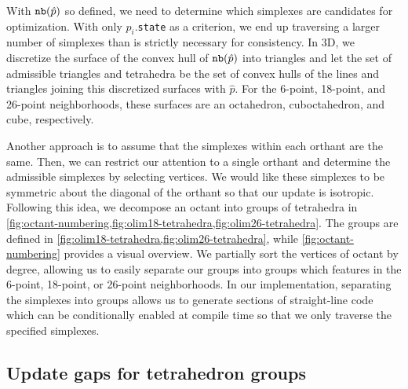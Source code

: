 \documentclass[eikonal.tex]{subfiles}
\begin{document}
With $\texttt{nb}(\hat{p})$ so defined, we need to determine which simplexes
are candidates for optimization. With only $p_i$.\texttt{state} as a
criterion, we end up traversing a larger number of simplexes than is
strictly necessary for consistency. In 3D, we discretize the surface
of the convex hull of $\texttt{nb}(\hat{p})$ into triangles and let the set
of admissible triangles and tetrahedra be the set of convex hulls of
the lines and triangles joining this discretized surfaces with
$\hat{p}$. For the 6-point, 18-point, and 26-point neighborhoods,
these surfaces are an octahedron, cuboctahedron, and cube,
respectively.

Another approach is to assume that the simplexes within each orthant
are the same. Then, we can restrict our attention to a single orthant
and determine the admissible simplexes by selecting vertices. We would
like these simplexes to be symmetric about the diagonal of the orthant
so that our update is isotropic. Following this idea, we decompose an
octant into groups of tetrahedra in
\cref{fig:octant-numbering,fig:olim18-tetrahedra,fig:olim26-tetrahedra}. The
groups are defined in
\cref{fig:olim18-tetrahedra,fig:olim26-tetrahedra}, while
\cref{fig:octant-numbering} provides a visual overview. We partially
sort the vertices of octant by degree, allowing us to easily separate
our groups into groups which features in the 6-point, 18-point, or
26-point neighborhoods. In our implementation, separating the
simplexes into groups allows us to generate sections of straight-line
code which can be conditionally enabled at compile time so that we
only traverse the specified simplexes.

\subsection{Update gaps for tetrahedron groups}
\end{document}
